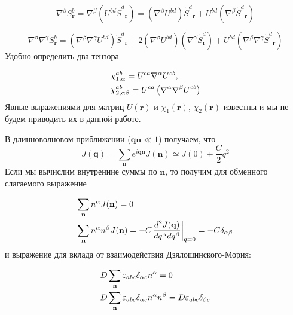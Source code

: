 \documentclass[a4paper,article,14pt]{extarticle}
\begin{document}
\[{\nabla ^\beta }S_{\mathbf{r}}^b = {\nabla ^\beta }\left( {{U^{bd}}{{\tilde S}^d}_{\mathbf{r}}} \right) = \left( {{\nabla ^\beta }{U^{bd}}} \right){{\tilde S}^d}_{\mathbf{r}} + {U^{bd}}\left( {{\nabla ^\beta }{{\tilde S}^d}_{\mathbf{r}}} \right)\]

	
\[{\nabla ^\beta }{\nabla ^\gamma }S_{\mathbf{r}}^b = \left( {{\nabla ^\beta }{\nabla ^\gamma }{U^{bd}}} \right){\tilde S^d}_{\mathbf{r}} + 2\left( {{\nabla ^\beta }{U^{bd}}} \right)\left( {{\nabla ^\gamma }\tilde S_{\mathbf{r}}^d} \right) + {U^{bd}}\left( {{\nabla ^\beta }{\nabla ^\gamma }{{\tilde S}^d}_{\mathbf{r}}} \right)\]
Удобно определить два тензора

\begin{eqnarray}
\label{eq:chi}
\begin{gathered}
  \chi _{1,\alpha }^{ab} = {U^{ca}}{\nabla ^\alpha }{U^{cb}}, \hfill \\
  \chi _{2,\alpha \beta }^{ab} = {U^{ca}}\left( {{\nabla ^\alpha }{\nabla ^\beta }{U^{cb}}} \right) \hfill \\ 
\end{gathered}
\end{eqnarray}
Явные выражениями для матриц $U(\mathbf{r})$ и $\chi_1(\mathbf{r})$, $\chi_2(\mathbf{r})$ известны \cite{paper:aristov} и мы не будем приводить их в данной работе.

В длинноволновом приближении (${\mathbf{qn}} \ll 1$) получаем, что
\[J({\mathbf{q}}) = \sum\limits_{\mathbf{n}} {{e^{i{\mathbf{qn}}}}J({\mathbf{n}})}  \simeq J(0) + \frac{C}{2}{q^2}\]
Если мы вычислим внутренние суммы по $\mathbf{n}$, то получим для обменного слагаемого выражение

\begin{eqnarray}
\label{eq:integrExch}
\begin{gathered}
  \sum\limits_{\mathbf{n}} {{n^\alpha }J({\mathbf{n}})}  = 0 \hfill \\
  \sum\limits_{\mathbf{n}} {{n^\alpha }{n^\beta }J({\mathbf{n}})}  =  - C{\left. {\frac{{{d^2}J({\mathbf{q}})}}{{d{q^\alpha }d{q^\beta }}}} \right|_{q = 0}} = - C{\delta _{\alpha \beta }} \hfill \\ 
\end{gathered}
\end{eqnarray}
и выражение для вклада от взаимодействия Дзялошинского-Мория:

\begin{eqnarray}
\label{eq:integrDM}
\begin{gathered}
  D\sum\limits_{\mathbf{n}} {{\varepsilon _{abc}}{\delta _{\alpha c}}{n^\alpha }}  = 0 \hfill \\
  D\sum\limits_{\mathbf{n}} {{\varepsilon _{abc}}{\delta _{\alpha c}}{n^\alpha }{n^\beta }}  = D{\varepsilon _{abc}}{\delta _{\beta c}} \hfill \\ 
\end{gathered}
\end{eqnarray}
\end{document}
